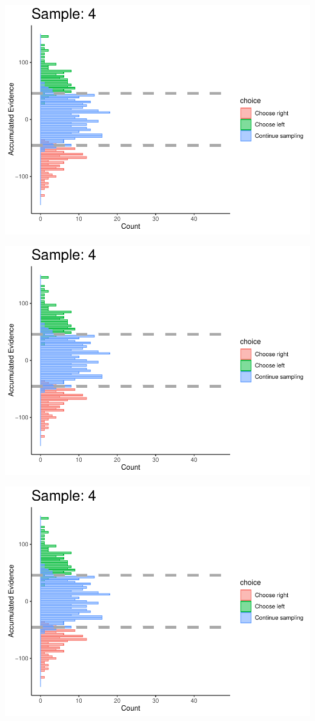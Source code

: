 \documentclass[
]{book}
\begin{document}
\begin{center}\includegraphics[width=0.8\linewidth]{LateNightBayes_files/figure-latex/collapsing_check-32} \end{center}

\begin{center}\includegraphics[width=0.8\linewidth]{LateNightBayes_files/figure-latex/collapsing_check-33} \end{center}

\begin{center}\includegraphics[width=0.8\linewidth]{LateNightBayes_files/figure-latex/collapsing_check-34} \end{center}
\end{document}

